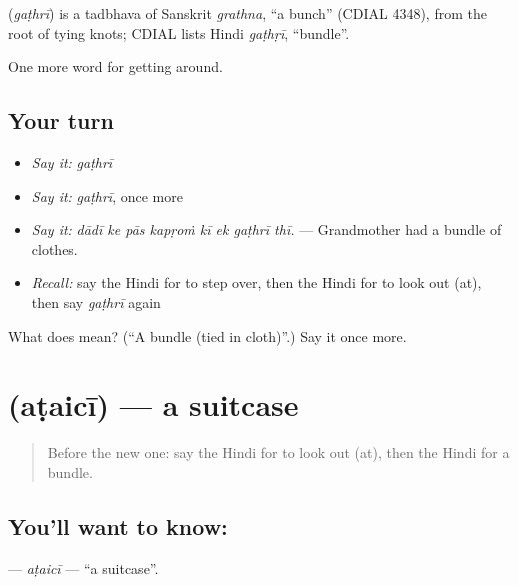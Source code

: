 \begin{cousinweb}
\textbf{} (\emph{gaṭhrī}) is a tadbhava of Sanskrit \emph{grathna}, \textquotedblleft{}a bunch\textquotedblright{} (CDIAL 4348), from the root of tying knots; CDIAL lists Hindi \emph{gaṭhṛī}, \textquotedblleft{}bundle\textquotedblright{}.
\end{cousinweb}

\begin{grammarlens}[title={What you've built}]
One more word for getting around.
\end{grammarlens}

\subsection*{Your turn}
\begin{itemize}
\raggedright
  \item \emph{Say it:} \emph{gaṭhrī}
  \item \emph{Say it:} \emph{gaṭhrī}, once more
  \item \emph{Say it:} \emph{dādī ke pās kapṛoṁ kī ek gaṭhrī thī.} — Grandmother had a bundle of clothes.
  \item \emph{Recall:} say the Hindi for to step over, then the Hindi for to look out (at), then say \emph{gaṭhrī} again
\end{itemize}

\begin{tcolorbox}[breakable,colback=teal!4,colframe=teal!35!black,title={Before you move on}]
What does  mean? (\textquotedblleft{}A bundle (tied in cloth)\textquotedblright{}.) Say it once more.
\end{tcolorbox}
\section[\texorpdfstring{\hi{अटैची} (aṭaicī)}{अटैची (aṭaicī)}]{ (aṭaicī) — a suitcase}

\label{lesson:HI-C402-ataici}



\begin{quote}
Before the new one: say the Hindi for to look out (at), then the Hindi for a bundle.
\end{quote}

\subsection*{You'll want to know: }
\textbf{} — \emph{aṭaicī} — \textquotedblleft{}a suitcase\textquotedblright{}.

